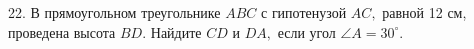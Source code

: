 22. В прямоугольном треугольнике $ABC$ с гипотенузой $AC,$ равной 12 см, проведена высота $BD.$ Найдите $CD$ и $DA,$ если угол $\angle A=30^\circ.$\\
